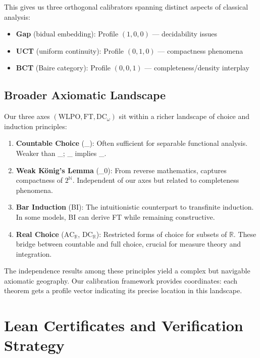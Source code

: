 \documentclass[11pt]{article}
\theoremstyle{definition}
\theoremstyle{remark}
\newcommand{\WLPO}{\mathrm{WLPO}}
\newcommand{\ACw}{\mathrm{AC}_\omega}
\newcommand{\DCw}{\mathrm{DC}_\omega}
\newcommand{\ACR}{\mathrm{AC}_{\mathbb{R}}}
\newcommand{\DCR}{\mathrm{DC}_{\mathbb{R}}}
\newcommand{\WKLz}{\mathrm{WKL}_0}
\newcommand{\FT}{\mathrm{FT}}
\begin{document}
This gives us three orthogonal calibrators spanning distinct aspects of classical analysis:
\begin{itemize}
\item \textbf{Gap} (bidual embedding): Profile $(1, 0, 0)$ — decidability issues
\item \textbf{UCT} (uniform continuity): Profile $(0, 1, 0)$ — compactness phenomena  
\item \textbf{BCT} (Baire category): Profile $(0, 0, 1)$ — completeness/density interplay
\end{itemize}

\subsection{Broader Axiomatic Landscape}\label{p2:sec:axes-survey}

Our three axes $(\WLPO, \FT, \DCw)$ sit within a richer landscape of choice and induction principles:

\begin{enumerate}
\item \textbf{Countable Choice} (\ACw): Often sufficient for separable functional analysis. Weaker than \DCw{}; \DCw{} implies \ACw{}.

\item \textbf{Weak König's Lemma} (\WKLz): From reverse mathematics, captures compactness of $2^{\mathbb{N}}$. Independent of our axes but related to completeness phenomena.

\item \textbf{Bar Induction} (BI): The intuitionistic counterpart to transfinite induction. In some models, BI can derive FT while remaining constructive.

\item \textbf{Real Choice} ($\ACR$, $\DCR$): Restricted forms of choice for subsets of $\mathbb{R}$. These bridge between countable and full choice, crucial for measure theory and integration.
\end{enumerate}

The independence results among these principles yield a complex but navigable axiomatic geography. Our calibration framework provides coordinates: each theorem gets a profile vector indicating its precise location in this landscape.

\section{Lean Certificates and Verification Strategy}\label{p2:sec:lean}
\end{document}
